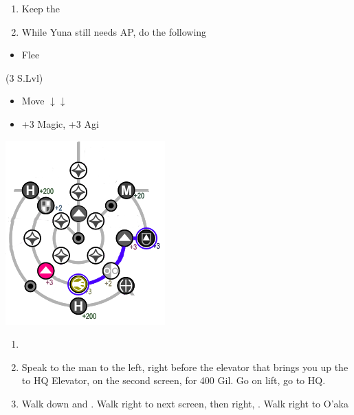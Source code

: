 \begin{enumerate}[resume]
  \item Keep the \formation{\kimahri}{\wakka}{\yuna}
  \item While Yuna still needs AP, do the following
\end{enumerate}
\begin{encounters}
  \begin{itemize}
    \wakkaf Attack Raptors or Gandarewas
    \yunaf Defend
    \item Flee
  \end{itemize}
\end{encounters}
\vfill
\begin{spheregrid}
\begin{itemize}
\yunaf (3 S.Lvl)
\begin{itemize}
      \item Move $\downarrow\downarrow$
      \item +3 Magic, +3 Agi
      \end{itemize}
      \includegraphics{graphics/Yuna_MRR_2}
      \end{itemize}
\end{spheregrid}
\begin{enumerate}[resume]
  \item \formation{\tidus}{\yuna}{\wakka}
  \item Speak to the man to the left, right before the elevator that brings you up the to HQ Elevator, on the second screen, for 400 Gil. Go on lift, go to HQ.
  \item Walk down and \sd. Walk right to next screen, then right, \sd. Walk right to O'aka
\end{enumerate}
